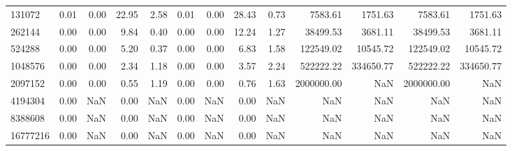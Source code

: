 \begin{tabular}{lrrrrrrrrrrrr}
131072 & 0.01 & 0.00 & 22.95 & 2.58 & 0.01 & 0.00 & 28.43 & 0.73 & 7583.61 & 1751.63 & 7583.61 & 1751.63 \\
262144 & 0.00 & 0.00 & 9.84 & 0.40 & 0.00 & 0.00 & 12.24 & 1.27 & 38499.53 & 3681.11 & 38499.53 & 3681.11 \\
524288 & 0.00 & 0.00 & 5.20 & 0.37 & 0.00 & 0.00 & 6.83 & 1.58 & 122549.02 & 10545.72 & 122549.02 & 10545.72 \\
1048576 & 0.00 & 0.00 & 2.34 & 1.18 & 0.00 & 0.00 & 3.57 & 2.24 & 522222.22 & 334650.77 & 522222.22 & 334650.77 \\
2097152 & 0.00 & 0.00 & 0.55 & 1.19 & 0.00 & 0.00 & 0.76 & 1.63 & 2000000.00 & NaN & 2000000.00 & NaN \\
4194304 & 0.00 & NaN & 0.00 & NaN & 0.00 & NaN & 0.00 & NaN & NaN & NaN & NaN & NaN \\
8388608 & 0.00 & NaN & 0.00 & NaN & 0.00 & NaN & 0.00 & NaN & NaN & NaN & NaN & NaN \\
16777216 & 0.00 & NaN & 0.00 & NaN & 0.00 & NaN & 0.00 & NaN & NaN & NaN & NaN & NaN \\
\bottomrule
\end{tabular}
